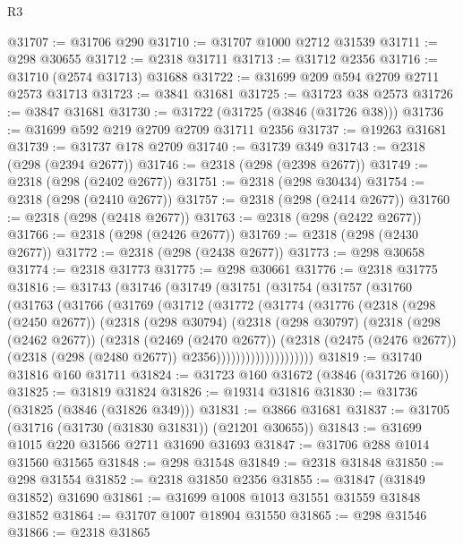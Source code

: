 \begin{lexlean}{R3}
\begin{coremodule}
@31707 := @31706 @290
@31710 := @31707 @1000 @2712 @31539
@31711 := @298 @30655
@31712 := @2318 @31711
@31713 := @31712 @2356
@31716 := @31710 (@2574 @31713) @31688
@31722 := @31699 @209 @594 @2709 @2711 @2573 @31713
@31723 := @3841 @31681
@31725 := @31723 @38 @2573
@31726 := @3847 @31681
@31730 := @31722 (@31725 (@3846 (@31726 @38)))
@31736 := @31699 @592 @219 @2709 @2709 @31711 @2356
@31737 := @19263 @31681
@31739 := @31737 @178 @2709
@31740 := @31739 @349
@31743 := @2318 (@298 (@2394 @2677))
@31746 := @2318 (@298 (@2398 @2677))
@31749 := @2318 (@298 (@2402 @2677))
@31751 := @2318 (@298 @30434)
@31754 := @2318 (@298 (@2410 @2677))
@31757 := @2318 (@298 (@2414 @2677))
@31760 := @2318 (@298 (@2418 @2677))
@31763 := @2318 (@298 (@2422 @2677))
@31766 := @2318 (@298 (@2426 @2677))
@31769 := @2318 (@298 (@2430 @2677))
@31772 := @2318 (@298 (@2438 @2677))
@31773 := @298 @30658
@31774 := @2318 @31773
@31775 := @298 @30661
@31776 := @2318 @31775
@31816 := @31743
    (@31746
      (@31749
        (@31751
          (@31754
            (@31757
              (@31760
                (@31763
                  (@31766
                    (@31769
                      (@31712
                        (@31772
                          (@31774
                            (@31776
                              (@2318
                                (@298 (@2450 @2677))
                                (@2318
                                  (@298 @30794)
                                  (@2318
                                    (@298 @30797)
                                    (@2318
                                      (@298 (@2462 @2677))
                                      (@2318
                                        (@2469 (@2470 @2677))
                                        (@2318
                                          (@2475 (@2476 @2677))
                                          (@2318 (@298 (@2480 @2677)) @2356))))))))))))))))))))
@31819 := @31740 @31816 @160 @31711
@31824 := @31723 @160 @31672 (@3846 (@31726 @160))
@31825 := @31819 @31824
@31826 := @19314 @31816
@31830 := @31736 (@31825 (@3846 (@31826 @349)))
@31831 := @3866 @31681
@31837 := @31705 (@31716 (@31730 (@31830 @31831)) (@21201 @30655))
@31843 := @31699 @1015 @220 @31566 @2711 @31690 @31693
@31847 := @31706 @288 @1014 @31560 @31565
@31848 := @298 @31548
@31849 := @2318 @31848
@31850 := @298 @31554
@31852 := @2318 @31850 @2356
@31855 := @31847 (@31849 @31852) @31690
@31861 := @31699 @1008 @1013 @31551 @31559 @31848 @31852
@31864 := @31707 @1007 @18904 @31550
@31865 := @298 @31546
@31866 := @2318 @31865

\end{coremodule}
\end{lexlean}
